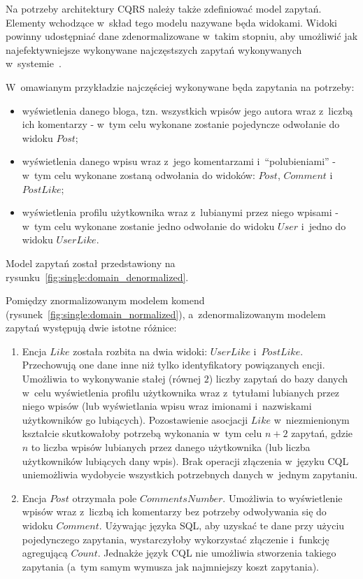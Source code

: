 



Na potrzeby architektury CQRS należy także zdefiniować model zapytań.
Elementy wchodzące w~skład tego modelu nazywane będa widokami.
Widoki powinny udostępniać dane zdenormalizowane w~takim stopniu, aby umożliwić jak najefektywniejsze wykonywane najczęstszych zapytań wykonywanych w~systemie~\cite{cassandra_model}.

W~omawianym przykładzie najczęściej wykonywane będa zapytania na potrzeby:

\begin{itemize}
 \item wyświetlenia danego bloga, tzn. wszystkich wpisów jego autora wraz z~liczbą ich komentarzy - w~tym celu wykonane zostanie pojedyncze odwołanie do widoku $Post$;
 \item wyświetlenia danego wpisu wraz z~jego komentarzami i~``polubieniami'' - w~tym celu wykonane zostaną odwołania do widoków: $Post$, $Comment$ i~$PostLike$;
 \item wyświetlenia profilu użytkownika wraz z~lubianymi przez niego wpisami - w~tym celu wykonane zostanie jedno odwołanie do widoku $User$ i~jedno do widoku $UserLike$.
\end{itemize}

Model zapytań został przedstawiony na rysunku~\ref{fig:single:domain_denormalized}.



Pomiędzy znormalizowanym modelem komend (rysunek~\ref{fig:single:domain_normalized}), a~zdenormalizowanym modelem zapytań występują dwie istotne różnice:

\begin{enumerate}
 \item Encja $Like$ została rozbita na dwia widoki: $UserLike$ i~$PostLike$.
 Przechowują one dane inne niż tylko identyfikatory powiązanych encji.
 Umożliwia to wykonywanie stałej (równej $2$) liczby zapytań do bazy danych w~celu wyświetlenia profilu użytkownika wraz z~tytułami lubianych przez niego wpisów (lub wyświetlania wpisu wraz imionami i~nazwiskami użytkowników go lubiących).
 Pozostawienie asocjacji $Like$ w~niezmienionym kształcie skutkowałoby potrzebą wykonania w~tym celu $n + 2$ zapytań, gdzie $n$ to liczba wpisów lubianych przez danego użytkownika (lub liczba użytkowników lubiących dany wpis).
 Brak operacji złączenia w~języku CQL uniemożliwia wydobycie wszystkich potrzebnych danych w~jednym zapytaniu.
 \item Encja $Post$ otrzymała pole $CommentsNumber$.
 Umożliwia to wyświetlenie wpisów wraz z~liczbą ich komentarzy bez potrzeby odwoływania się do widoku $Comment$.
 Używając języka SQL, aby uzyskać te dane przy użyciu pojedynczego zapytania, wystarczyłoby wykorzystać złączenie i~funkcję agregującą $Count$.
 Jednakże język CQL nie umożliwia stworzenia takiego zapytania (a~tym samym wymusza jak najmniejszy koszt zapytania).
\end{enumerate}



